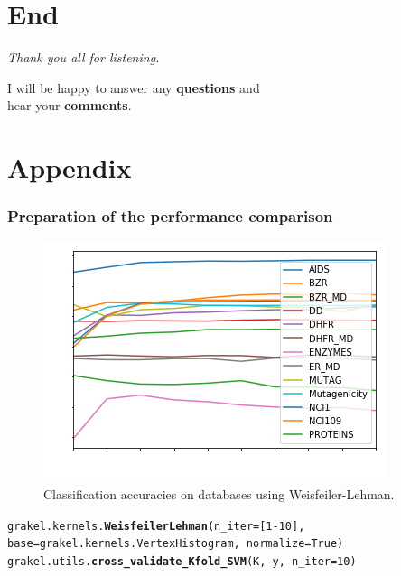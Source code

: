\section{End}

\begin{frame}[c]
	\centering %
	\begin{huge}
		\emph{Thank you all for listening.}\\
	\end{huge}
	\vspace{2 cm}
	I will be happy to answer any \textbf{questions} and\\
	hear your \textbf{comments}.
\end{frame}

\appendix
\section{Appendix}


\begin{frame}[noframenumbering]
	\frametitle{Preparation of the performance comparison}	
	\begin{figure}
		\centering
		\includegraphics[width=0.6\linewidth]{images/plot_whiteText}
		\caption{Classification accuracies on databases using Weisfeiler-Lehman.}
		\label{fig:plot}
	\end{figure}
	\tiny{\texttt{grakel.kernels.\textbf{WeisfeilerLehman}(n\_iter=[1-10], base=grakel.kernels.VertexHistogram, normalize=True)}}\\
	\tiny{\texttt{grakel.utils.\textbf{cross\_validate\_Kfold\_SVM}(K, y, n\_iter=10)}}
\end{frame}

